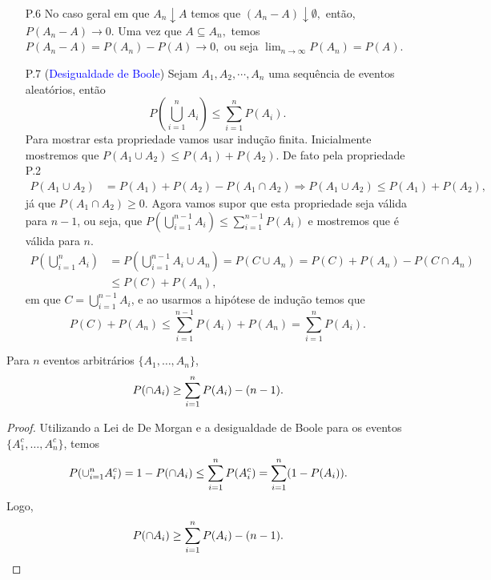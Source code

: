 \begin{frame}


\begin{enumerate}
\item[P.6] No caso geral em que $ A_n \downarrow A $ temos que $(A_n - A) \downarrow \emptyset,$ então, $ P(A_n - A)\rightarrow 0.$  Uma vez que $A \subseteq A_n,$ temos  $P(A_n - A)= P(A_n) - P(A)\rightarrow 0,$ ou seja $ \lim_{n \rightarrow \infty}P(A_n)=P(A).$
	
\item[P.7]   (\textcolor{blue}{Desigualdade de Boole}) Sejam $ A_1, A_2, \cdots , A_n $ uma sequência de eventos aleatórios, então $$ P\left(\bigcup_{i=1}^{n}A_i\right)\leq \sum_{i=1}^{n} P(A_i).$$ Para mostrar esta propriedade vamos usar indução finita. Inicialmente mostremos que $ P(A_1\cup A_2)\leq P(A_1)+P(A_2).$ De fato pela propriedade P.2 
$$
\begin{aligned}
P(A_1\cup A_2)&=P(A_1)+P(A_2)-P(A_1\cap A_2)  \Rightarrow P(A_1\cup A_2)\leq P(A_1)+P(A_2),
\end{aligned}
$$ 
já que $ P(A_1 \cap A_2)\geq 0 $.  Agora vamos supor que esta propriedade seja válida para $n-1$, ou seja, que $ P\left(\displaystyle \bigcup_{i=1}^{n-1}A_i\right)\leq \displaystyle\sum_{i=1}^{n-1} P(A_i) $ e mostremos que é válida para $n.$ $$
\begin{aligned}
P\left(\bigcup_{i=1}^{n}A_i\right)& =P\left(\bigcup_{i=1}^{n-1}A_i \cup A_n\right) =P(C \cup A_n)=P(C)+P(A_n)-P(C\cap A_n) \\ & \leq P(C)+P(A_n),
\end{aligned}
$$ em que $ C= \bigcup_{i=1}^{n-1}A_i $, e ao usarmos a hipótese de indução temos que 
$$ P(C)+P(A_n)\leq \sum_{i=1}^{n-1} P(A_i) + P(A_n)= \sum_{i=1}^{n} P(A_i).$$ 
\end{enumerate}

\end{frame}

\begin{frame}
	
	
	\begin{corol} Para $n$ eventos arbitrários $\{A_1,\ldots,A_n\}$,
	$$P(\cap A_i)\geq \sum_{i=1}^{n}P(A_i)-(n-1).$$ \end{corol}
	
	\begin{proof} Utilizando a Lei de De Morgan e a desigualdade de Boole para os
	eventos $\{A_1^c,\ldots,A_n^c\}$, temos
	$$P(\cup_{i=1}^{n}A_i^c)=1-P(\cap A_i)\leq \sum_{i=1}^{n}P(A_i^c)=\sum_{i=1}^{n}(1-P(A_i)).$$
	Logo,
	$$P(\cap A_i)\geq \sum_{i=1}^{n}P(A_i)-(n-1).$$ \end{proof}
\end{frame}


